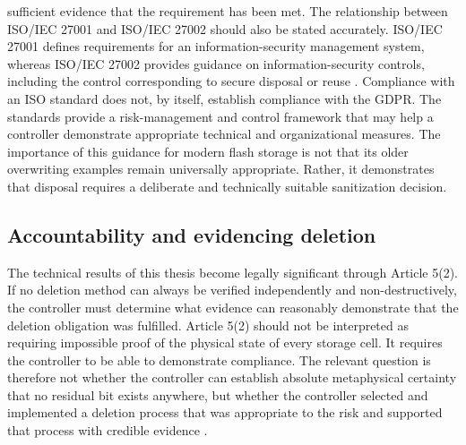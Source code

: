  sufficient evidence that the requirement has been met. The relationship between ISO/IEC 27001 and ISO/IEC 27002 should also be stated 
 accurately. ISO/IEC 27001 defines requirements for an information-security management system, whereas ISO/IEC 27002 provides guidance on 
 information-security controls, including the control corresponding to secure disposal or reuse \cite{iso27002_2022}. Compliance with an ISO 
 standard does not, by itself, establish compliance with the GDPR. The standards provide a risk-management and control framework that may 
 help a controller demonstrate appropriate technical and organizational measures. The importance of this guidance for modern flash storage 
 is not that its older overwriting examples remain universally appropriate. Rather, it demonstrates that disposal requires a deliberate and 
 technically suitable sanitization decision.

\subsection{Accountability and evidencing deletion}
The technical results of this thesis become legally significant through Article 5(2). If no deletion method can always be verified independently 
and non-destructively, the controller must determine what evidence can reasonably demonstrate that the deletion obligation was fulfilled. Article 5(2) 
should not be interpreted as requiring impossible proof of the physical state of every storage cell. It requires the controller to be able to 
demonstrate compliance. The relevant question is therefore not whether the controller can establish absolute metaphysical certainty that no 
residual bit exists anywhere, but whether the controller selected and implemented a deletion process that was appropriate to the risk and supported 
that process with credible evidence \cite{gdpr2016}.

